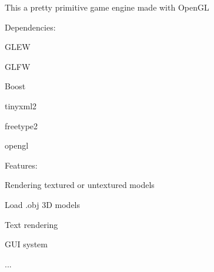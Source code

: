 This a pretty primitive game engine made with Open\+GL

Dependencies\+:
\begin{DoxyItemize}
\item G\+L\+EW
\item G\+L\+FW
\item Boost
\item tinyxml2
\item freetype2
\item opengl
\end{DoxyItemize}

Features\+:
\begin{DoxyItemize}
\item Rendering textured or untextured models
\item Load .obj 3D models
\item Text rendering
\item G\+UI system
\item ... 
\end{DoxyItemize}